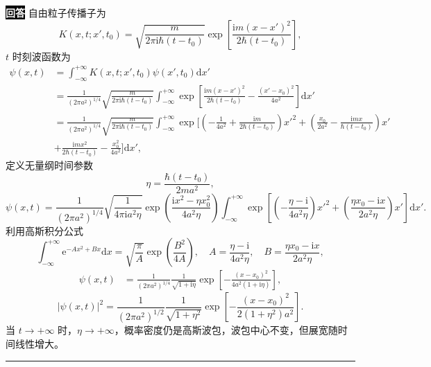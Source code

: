 \documentclass[11pt,a4paper]{ctexart}
\newenvironment{answer}
  {\par\smallskip\noindent
   \begingroup
   \setlength{\fboxsep}{4pt}%
   \colorbox{black}{\textcolor{white}{\bfseries 回答}}%
   \endgroup
   \quad\ignorespaces}
  {\par\smallskip\noindent\rule{\linewidth}{0.4pt}\medskip}
\begin{document}
\begin{answer}
  自由粒子传播子为
    \begin{equation}
    K(x,t;x',t_0)
    =\sqrt{\frac{m }{2\pi\mathrm{i}\hbar(t-t_0) } } \exp\left[\frac{\mathrm{i}m\left(x-x' \right)^2 }{2\hbar (t-t_0) }  \right],
  \end{equation}
  $t $ 时刻波函数为
  \begin{equation}
    \begin{aligned}
      \psi(x,t)
      &=\int_{-\infty}^{+\infty} K(x,t;x',t_0) \psi(x',t_0)\mathrm{d}x' \\
      &=\frac{1}{\left(2\pi a^2\right)^{1/4}}\sqrt{\frac{m }{2\pi\mathrm{i}\hbar(t-t_0) } }\int_{-\infty}^{+\infty} \exp\left[\frac{\mathrm{i}m\left(x-x' \right)^2 }{2\hbar (t-t_0) } - \frac{(x'-x_0)^2}{4a^2} \right]\mathrm{d}x' \\
      &=\frac{1}{\left(2\pi a^2\right)^{1/4}}\sqrt{\frac{m }{2\pi\mathrm{i}\hbar(t-t_0) } }\int_{-\infty}^{+\infty} \exp\bigg[\left(-\frac{1 }{4a^2 }+\frac{\mathrm{i}m }{2\hbar(t-t_0) }   \right)x'^2 + \left(\frac{x_0 }{2a^2 }-\frac{\mathrm{i}mx }{\hbar(t-t_0) } \right)x' \\
      &+\frac{\mathrm{i}mx^2 }{2\hbar(t-t_0) }-\frac{x_0^2 }{4a^2 }   \bigg]\mathrm{d}x',
    \end{aligned}
  \end{equation}
  定义无量纲时间参数
  \begin{equation}
    \eta
    =\frac{\hbar(t-t_0) }{2ma^2 }, 
  \end{equation}
  \begin{equation}
    \psi(x,t)
    =\frac{1}{\left(2\pi a^2\right)^{1/4}}\sqrt{\frac{1 }{4\pi\mathrm{i}a^2 \eta} } \exp\left(\frac{\mathrm{i}x^2-\eta x_0^2 }{4a^2\eta }  \right) \int_{-\infty}^{+\infty} \exp\left[\left(-\frac{\eta-\mathrm{i} }{4a^2\eta }   \right)x'^2 + \left(\frac{\eta x_0 - \mathrm{i}x }{2a^2\eta } \right)x' \right]\mathrm{d}x'.
  \end{equation}
  利用高斯积分公式
  \begin{equation}
    \int_{-\infty}^{+\infty} \mathrm{e}^{-Ax^2+Bx}\mathrm{d}x
    =\sqrt{\frac{\pi }{A } }\exp\left(\frac{B^2 }{4A }  \right),\quad
    A=\frac{\eta-\mathrm{i} }{4a^2\eta },\quad
    B=\frac{\eta x_0 - \mathrm{i}x }{2a^2\eta },
  \end{equation}
  \begin{equation}
    \begin{aligned}
      \psi(x,t)
      &=\frac{1}{\left(2\pi a^2\right)^{1/4}} \frac{1 }{\sqrt{1+\mathrm{i}\eta} }  \exp\left[-\frac{(x-x_0)^2 }{4a^2(1+\mathrm{i}\eta) }  \right],
    \end{aligned}
  \end{equation}
  \begin{equation}
    \left|\psi(x,t) \right|^2
    =\frac{1 }{\left(2\pi a^2 \right)^{1/2} } \frac{1 }{\sqrt{1+\eta^2} } \exp\left[-\frac{(x-x_0)^2 }{2\left(1+\eta^2 \right)a^2 }  \right].
  \end{equation}
  当 $t\to +\infty $ 时，$\eta\to +\infty $，概率密度仍是高斯波包，波包中心不变，但展宽随时间线性增大。

\end{answer}
\end{document}
